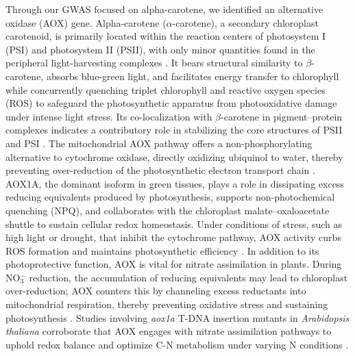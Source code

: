 \documentclass[10pt,letterpaper]{article}
\begin{document}
Through our GWAS focused on alpha-carotene, we  identified an alternative oxidase (AOX) gene. Alpha-carotene (\(\alpha\)-carotene), a secondary chloroplast carotenoid, is primarily located within the reaction centers of photosystem I (PSI) and photosystem II (PSII), with only minor quantities found in the peripheral light-harvesting complexes \citep{Young1989}. It bears structural similarity to \(\beta\)-carotene, absorbs blue-green light, and facilitates energy transfer to chlorophyll while concurrently quenching triplet chlorophyll and reactive oxygen species (ROS) to safeguard the photosynthetic apparatus from photooxidative damage under intense light stress. Its co-localization with \(\beta\)-carotene in pigment–protein complexes indicates a contributory role in stabilizing the core structures of PSII and PSI \citep{Young1989}. The mitochondrial AOX pathway offers a non-phosphorylating alternative to cytochrome oxidase, directly oxidizing ubiquinol to water, thereby preventing over-reduction of the photosynthetic electron transport chain \citep{Vishwakarma2015}. AOX1A, the dominant isoform in green tissues, plays a role in dissipating excess reducing equivalents produced by photosynthesis, supports non-photochemical quenching (NPQ), and collaborates with the chloroplast malate–oxaloacetate shuttle to sustain cellular redox homeostasis. Under conditions of stress, such as high light or drought, that inhibit the cytochrome pathway, AOX activity curbs ROS formation and maintains photosynthetic efficiency \citep{Vishwakarma2015}. In addition to its photoprotective function, AOX is vital for nitrate assimilation in plants. During NO\(_3^-\) reduction, the accumulation of reducing equivalents may lead to chloroplast over-reduction; AOX counters this by channeling excess reductants into mitochondrial respiration, thereby preventing oxidative stress and sustaining photosynthesis \citep{Gandin2014}. Studies involving \emph{aox1a} T-DNA insertion mutants in \emph{Arabidopsis thaliana} corroborate that AOX engages with nitrate assimilation pathways to uphold redox balance and optimize C-N metabolism under varying N conditions \citep{Gandin2014,Vishwakarma2015}.
\end{document}
